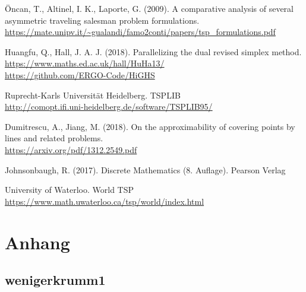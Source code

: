 \documentclass[a4paper, 10pt, ngerman]{article}
\begin{document}
\inputminted{c++}{aufgabe1/aufgabe1_randomized.cpp}

\begin{thebibliography}{4}
    Öncan, T., Altinel, I. K., Laporte, G. (2009).
    A comparative analysis of several asymmetric traveling salesman problem formulations. \\
    \href{https://mate.unipv.it/gualandi/famo2conti/papers/tsp_formulations.pdf}{https://mate.unipv.it/\textasciitilde{}gualandi/famo2conti/papers/tsp\_formulations.pdf}
    
    Huangfu, Q., Hall, J. A. J. (2018).
    Parallelizing the dual revised simplex method. \\
    \href{https://www.maths.ed.ac.uk/hall/HuHa13/}{https://www.maths.ed.ac.uk/hall/HuHa13/} \\
    \href{https://github.com/ERGO-Code/HiGHS}{https://github.com/ERGO-Code/HiGHS}

    Ruprecht-Karls Universität Heidelberg. TSPLIB \\
    \href{http://comopt.ifi.uni-heidelberg.de/software/TSPLIB95/}{http://comopt.ifi.uni-heidelberg.de/software/TSPLIB95/}

    Dumitrescu, A., Jiang, M. (2018).
    On the approximability of covering points by lines and related problems. \\
    \href{https://arxiv.org/pdf/1312.2549.pdf}{https://arxiv.org/pdf/1312.2549.pdf}

    Johnsonbaugh, R. (2017). 
    Discrete Mathematics (8. Auflage). Pearson Verlag

    University of Waterloo. World TSP \\
    \href{https://www.math.uwaterloo.ca/tsp/world/index.html}{https://www.math.uwaterloo.ca/tsp/world/index.html}
\end{thebibliography}

\section*{Anhang}

\subsection*{wenigerkrumm1}
\end{document}
